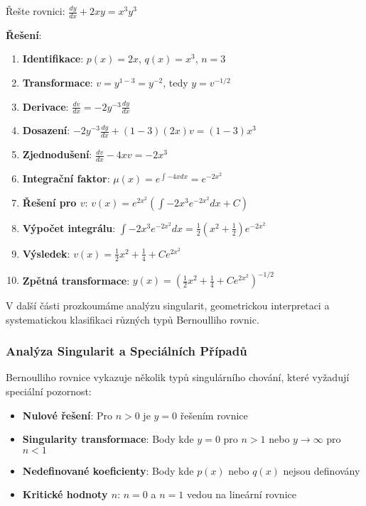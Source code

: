 \begin{example}
\label{ex:kompletni-transformace}
Řešte rovnici: $\frac{dy}{dx} + 2xy = x^3y^3$

\textbf{Řešení}:
\begin{enumerate}
\item \textbf{Identifikace}: $p(x) = 2x$, $q(x) = x^3$, $n = 3$
\item \textbf{Transformace}: $v = y^{1-3} = y^{-2}$, tedy $y = v^{-1/2}$
\item \textbf{Derivace}: $\frac{dv}{dx} = -2y^{-3}\frac{dy}{dx}$
\item \textbf{Dosazení}: $-2y^{-3}\frac{dy}{dx} + (1-3)(2x)v = (1-3)x^3$
\item \textbf{Zjednodušení}: $\frac{dv}{dx} - 4xv = -2x^3$
\item \textbf{Integrační faktor}: $\mu(x) = e^{\int -4x dx} = e^{-2x^2}$
\item \textbf{Řešení pro $v$}: $v(x) = e^{2x^2}\left(\int -2x^3 e^{-2x^2} dx + C\right)$
\item \textbf{Výpočet integrálu}: $\int -2x^3 e^{-2x^2} dx = \frac{1}{2}(x^2 + \frac{1}{2})e^{-2x^2}$
\item \textbf{Výsledek}: $v(x) = \frac{1}{2}x^2 + \frac{1}{4} + Ce^{2x^2}$
\item \textbf{Zpětná transformace}: $y(x) = \left(\frac{1}{2}x^2 + \frac{1}{4} + Ce^{2x^2}\right)^{-1/2}$
\end{enumerate}
\end{example}

\vspace{0.8\baselineskip}

\begin{transition}
V další části prozkoumáme analýzu singularit, geometrickou interpretaci a systematickou klasifikaci různých typů Bernoulliho rovnic.
\end{transition}

\subsubsection{Analýza Singularit a Speciálních Případů}
\label{subsubsec:analyza-singularit}

\begin{analysis}
\label{ana:singularni-chovani}
Bernoulliho rovnice vykazuje několik typů singulárního chování, které vyžadují speciální pozornost:

\begin{itemize}
\item \textbf{Nulové řešení}: Pro $n > 0$ je $y = 0$ řešením rovnice
\item \textbf{Singularity transformace}: Body kde $y = 0$ pro $n > 1$ nebo $y \to \infty$ pro $n < 1$
\item \textbf{Nedefinované koeficienty}: Body kde $p(x)$ nebo $q(x)$ nejsou definovány
\item \textbf{Kritické hodnoty $n$}: $n = 0$ a $n = 1$ vedou na lineární rovnice
\end{itemize}
\end{analysis}

